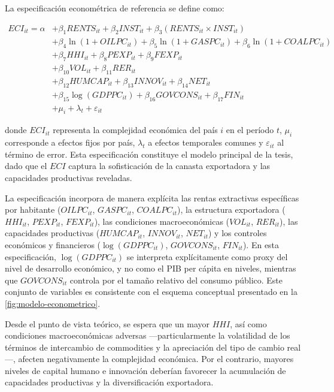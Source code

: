 \documentclass[../../TFM.tex]{subfiles}
\begin{document}
	La especificación econométrica de referencia se define como:

	\begin{equation}
		\label{eq:modelo_base}
		\begin{aligned}
			ECI_{it} = \alpha
			&+ \beta_1 RENTS_{it}
			+ \beta_2 INST_{it}
			+ \beta_3(RENTS_{it} \times INST_{it}) \\
			&+ \beta_4 \ln(1+OILPC_{it})
			+ \beta_5 \ln(1+GASPC_{it})
			+ \beta_6 \ln(1+COALPC_{it}) \\
			&+ \beta_7 HHI_{it}
			+ \beta_8 PEXP_{it}
			+ \beta_9 FEXP_{it} \\
			&+ \beta_{10} VOL_{it}
			+ \beta_{11} RER_{it} \\
			&+ \beta_{12} HUMCAP_{it}
			+ \beta_{13} INNOV_{it}
			+ \beta_{14} NET_{it} \\
			&+ \beta_{15}\log(GDPPC_{it})
			+ \beta_{16} GOVCONS_{it}
			+ \beta_{17} FIN_{it} \\
			&+ \mu_i + \lambda_t + \varepsilon_{it}
		\end{aligned}
	\end{equation}

	donde $ECI_{it}$ representa la complejidad económica del país $i$ en el período $t$, $\mu_i$ corresponde a efectos fijos por país, $\lambda_t$ a efectos temporales comunes y $\varepsilon_{it}$ al término de error. Esta especificación constituye el modelo principal de la tesis, dado que el $ECI$ captura la sofisticación de la canasta exportadora y las capacidades productivas reveladas.

	La especificación incorpora de manera explícita las rentas extractivas
	específicas por habitante ($OILPC_{it}$, $GASPC_{it}$, $COALPC_{it}$), la
	estructura exportadora ($HHI_{it}$, $PEXP_{it}$, $FEXP_{it}$), las condiciones
	macroeconómicas ($VOL_{it}$, $RER_{it}$), las capacidades productivas
	($HUMCAP_{it}$, $INNOV_{it}$, $NET_{it}$) y los controles económicos y
	financieros ($\log(GDPPC_{it})$, $GOVCONS_{it}$, $FIN_{it}$). En esta
	especificación, $\log(GDPPC_{it})$ se interpreta explícitamente como proxy del
	nivel de desarrollo económico, y no como el PIB per cápita en niveles,
	mientras que $GOVCONS_{it}$ controla por el tamaño relativo del consumo
	público. Este conjunto de variables es consistente con el esquema conceptual
	presentado en la \autoref{fig:modelo-econometrico}.

	Desde el punto de vista teórico, se espera que un mayor $HHI$, así como condiciones macroeconómicas adversas ---particularmente la volatilidad de los términos de intercambio de commodities y la apreciación del tipo de cambio real---, afecten negativamente la complejidad económica. Por el contrario, mayores niveles de capital humano e innovación deberían favorecer la acumulación de capacidades productivas y la diversificación exportadora.
\end{document}
